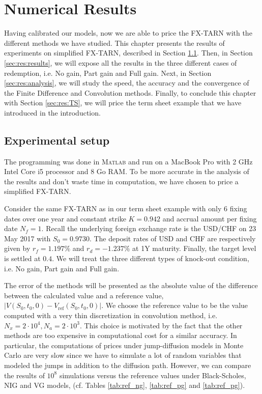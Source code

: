 \chapter{Numerical Results}
\label{sec:results}


Having calibrated our models, now we are able to price the FX-TARN with the different methods we have studied. This chapter presents the results of experiments on simplified FX-TARN, described in Section \ref{sec:res:setup}. Then, in Section \ref{sec:res:results}, we will expose all the results in the three different cases of redemption, i.e. No gain, Part gain and Full gain. Next, in Section \ref{sec:res:analysis}, we will study the speed, the accuracy and the convergence of the Finite Difference and Convolution methods. Finally, to conclude this chapter with Section \ref{sec:res:TS}, we will price the term sheet example that we have introduced in the introduction.

\section{Experimental setup}
\label{sec:res:setup}
The programming was done in \textsc{Matlab} and run on a MacBook Pro with 2 GHz Intel Core i5 processor and 8 Go RAM. To be more accurate in the analysis of the results and don't waste time in computation, we have chosen to price a simplified FX-TARN. 

Consider the same FX-TARN as in our term sheet example with only 6 fixing dates over one year and constant strike $K = 0.942$ and accrual amount per fixing date $N_f=1$. Recall the underlying foreign exchange rate is the USD/CHF on 23 May 2017 with $S_0 = 0.9730$. The deposit rates of USD and CHF are respectively given by $r_f = 1.197\%$ and $r_d = -1.237\%$ at 1Y maturity. Finally, the target level is settled at $0.4$. We will treat the three different types of knock-out condition, i.e. No gain, Part gain and Full gain.

The error of the methods will be presented as the absolute value of the difference between the calculated value and a reference value, $|V(S_0,t_0,0)-V_\text{ref}(S_0,t_0,0)|$. We choose the reference value to be the value computed with a very thin discretization in convolution method, i.e. $N_x = 2\cdot10^4,N_a = 2\cdot10^3$. This choice is motivated by the fact that the other methods are too expensive in computational cost for a similar accuracy. In particular, the computations of prices under jump-diffusion models in Monte Carlo are very slow since we have to simulate a lot of random variables that modeled the jumps in addition to the diffusion path. However, we can compare the results of $10^8$ simulations versus the reference values under Black-Scholes, NIG and VG models, (cf. Tables \ref{tab:ref_ng}, \ref{tab:ref_pg} and \ref{tab:ref_pg}).

